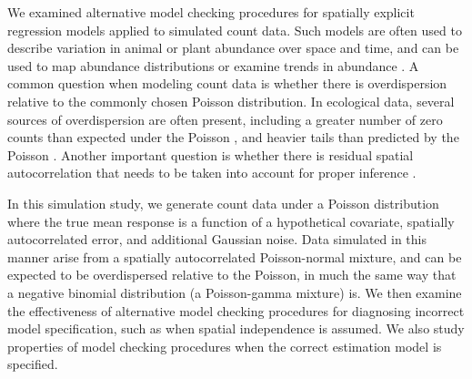 \documentclass[12pt,english]{article}
\begin{document}
\begin{spacing}{1.9}
We examined alternative model checking procedures for spatially
explicit regression models applied to simulated count data.  Such
models are often used to describe variation in animal or plant
abundance over space and time, and can be used to map abundance
distributions or examine trends in abundance
\citep[e.g.,][]{SauerLink2011,ConnEtAl2014}.  A common question when
modeling count data is whether there is overdispersion relative to the
commonly chosen Poisson distribution.  In ecological data, several
sources of overdispersion are often present, including a greater
number of zero counts than expected under the Poisson \citep[zero
inflation;][]{AgarwalEtAl2002}, and heavier tails than predicted by
the Poisson \citep{PottsElith2006,VerHoefBoveng2007}.  Another
important question is whether there is residual spatial
autocorrelation that needs to be taken into account for proper
inference \citep{Legendre1993,LichsteinEtAl2002}.

In this simulation study, we generate count data under a Poisson
distribution where the true mean response is a function of a
hypothetical covariate, spatially autocorrelated error, and additional
Gaussian noise.  Data simulated in this manner arise from a spatially autocorrelated Poisson-normal mixture, and
can be expected to be overdispersed relative to the Poisson, in much
the same way that a negative binomial distribution (a Poisson-gamma
mixture) is.  We then examine the effectiveness of alternative model
checking procedures for diagnosing incorrect model specification, such
as when spatial independence is assumed.  We also study properties of
model checking procedures when the correct estimation model is
specified.


\end{spacing}
\end{document}
